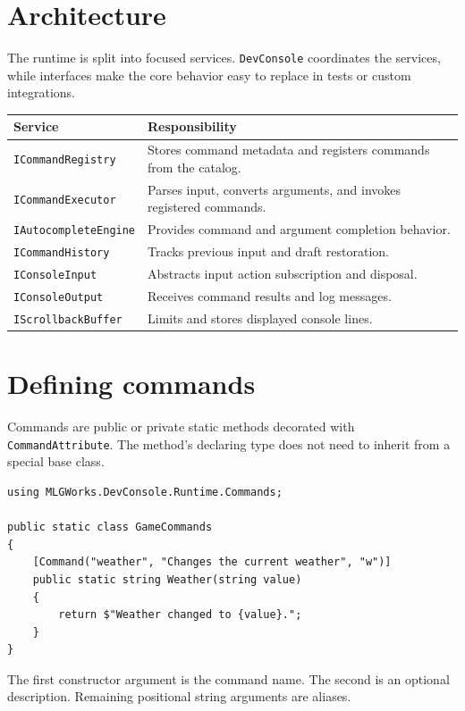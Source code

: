\documentclass[11pt,a4paper]{article}
\begin{document}
\section{Architecture}

The runtime is split into focused services. \texttt{DevConsole} coordinates the services, while interfaces make the core behavior easy to replace in tests or custom integrations.

\begin{longtable}{p{}p{}}
\toprule
\textbf{Service} & \textbf{Responsibility} \\
\midrule
\endhead
\texttt{ICommandRegistry} & Stores command metadata and registers commands from the catalog. \\
\texttt{ICommandExecutor} & Parses input, converts arguments, and invokes registered commands. \\
\texttt{IAutocompleteEngine} & Provides command and argument completion behavior. \\
\texttt{ICommandHistory} & Tracks previous input and draft restoration. \\
\texttt{IConsoleInput} & Abstracts input action subscription and disposal. \\
\texttt{IConsoleOutput} & Receives command results and log messages. \\
\texttt{IScrollbackBuffer} & Limits and stores displayed console lines. \\
\bottomrule
\end{longtable}

\section{Defining commands}

Commands are public or private static methods decorated with \texttt{CommandAttribute}. The method's declaring type does not need to inherit from a special base class.

\begin{lstlisting}[style=csharp]
using MLGWorks.DevConsole.Runtime.Commands;

public static class GameCommands
{
    [Command("weather", "Changes the current weather", "w")]
    public static string Weather(string value)
    {
        return $"Weather changed to {value}.";
    }
}
\end{lstlisting}

The first constructor argument is the command name. The second is an optional description. Remaining positional string arguments are aliases.
\end{document}
